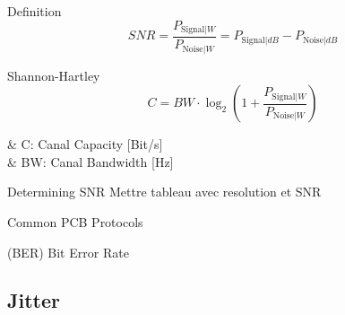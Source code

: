 \begin{frame}{Definition}
    \begin{equation}
        SNR = \frac{P_{\text{Signal}|\unit{W}}}{P_{\text{Noise}|\unit{W}}}=P_{\text{Signal}|\unit{dB}} - P_{\text{Noise}|\unit{dB}}
    \end{equation}
\end{frame}

\begin{frame}{Shannon-Hartley}
    \begin{equation}
        C = BW \cdot \log_{2}\left( 1+\frac{P_{\text{Signal}|\unit{W}}}{P_{\text{Noise}|\unit{W}}} \right)
    \end{equation}
    \begin{makelist}[\small][1.5]
        \icon{\faCloudversify} & C: Canal Capacity [Bit/s]\\
        \icon{\faChartArea} & BW: Canal Bandwidth [Hz]
    \end{makelist}
\end{frame}
% 
% 
\begin{frame}{Determining SNR}
    Mettre tableau avec resolution et SNR
\end{frame}

\begin{frame}{Common PCB Protocols}
\end{frame}

\begin{frame}{(BER) Bit Error Rate}
\end{frame}

\subsection[5min-Pascal]{Jitter}
\pascalbackground


